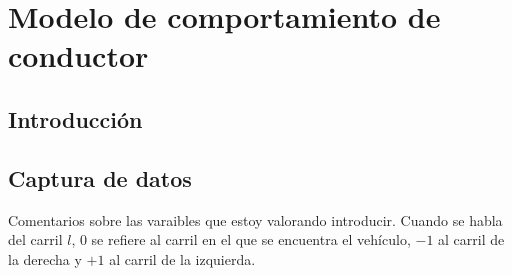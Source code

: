 \chapter{Modelo de comportamiento de conductor}
\label{ch:behavior-model}

\section{Introducción}


\section{Captura de datos}


Comentarios sobre las varaibles que estoy valorando introducir. Cuando se habla del carril $l$, 0 se refiere al carril en el que se encuentra el vehículo, $-1$ al carril de la derecha y $+1$ al carril de la izquierda.

